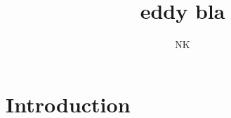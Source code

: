 \documentclass{beamer}
\begin{document}
\title{eddy bla}  
\author{NK}
\section{Introduction}

%
%
%


\end{document}
